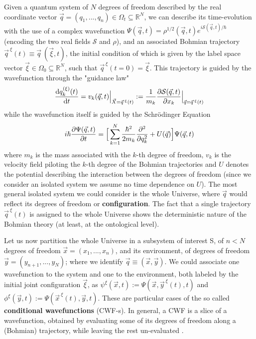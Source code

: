 \documentclass[11pt, a4paper]{article} %
\newcommand{\R}{\mathbb{R}} %
\begin{document}
Given a quantum system of $N$ degrees of freedom described by the real coordinate vector $\vec{q}=(q_1,..., q_n)\in\Omega_t\subseteq\R^N$, we can describe its time-evolution with the use of a complex wavefunction $\Psi(\vec{q},t)=\rho^{1/2}(\vec{q},t)e^{i\mathcal{S}(\vec{q},t)/\hbar}$ (encoding the two real fields $\mathcal{S}$ and $\rho$), and an associated Bohmian trajectory $\vec{q}^{\:\xi}(t)\equiv \vec{q}\:(\vec{\xi},t)$, the initial condition of which is given by the label space vector $\vec{\xi}\in\Omega_0\subseteq\R^N$, such that $\vec{q}^{\:\xi}(t=0)=\vec{\xi}$. This trajectory is guided by the wavefunction through the "guidance law"
\begin{equation}\label{GL}
\dv{q_k^{ (\xi)}(t)}{t} = v_k(\vec{q},t)\Big\rvert_{\vec{X}=\vec{q}^{\:\xi}(t)}:=\frac{1}{m_k} \pdv{\mathcal{S}(\vec{q},t)}{x_k}\Big\rvert_{\vec{q}=\vec{q}^{\:\xi}(t)}
\end{equation}
while the wavefunction itself is guided by the Schrödinger Equation \cite{Bohm,Holland,Durr,JordiXavier}
\begin{equation}\label{SE}
i\hbar\pdv{\Psi(\vec{q},t)}{t}=\Big[ \sum_{k=1}^N \frac{\hbar^2}{2m_k}\pdv[2]{}{q_k}+U(\vec{q})\Big]\Psi(\vec{q},t)
\end{equation}
where $m_k$ is the mass associated with the $k$-th degree of freedom, $v_k$ is the velocity field piloting the $k$-th degree of the Bohmian trajectories and $U$ denotes the potential describing the interaction between the degrees of freedom (since we consider an isolated system we assume no time dependence on $U$). The most general isolated system we could consider is the whole Universe, where $\vec{q}$ would reflect its degrees of freedom or {\bf configuration}. The fact that a single trajectory $\vec{q}^{\:\xi}(t)$ is assigned to the whole Universe shows the deterministic nature of the Bohmian theory (at least, at the ontological level). 

Let us now partition the whole Universe in a subsystem of interest S, of $n<N$ degrees of freedom $\vec{x}=(x_1,...,x_n)$, and its environment, of degrees of freedom $\vec{y}=(y_{n+1},...,y_N)$; where we identify $\vec{q}\equiv (\vec{x},\vec{y})$. We could associate one wavefunction to the system and one to the environment, both labeled by the initial joint configuration $\vec{\xi}$, as $\psi^\xi(\vec{x},t):=\Psi(\vec{x},\vec{y}^{\:\xi}(t),t)$ and $\phi^\xi(\vec{y},t):=\Psi(\vec{x}^{\:\xi}(t),\vec{y},t)$. These are particular cases of the so called {\bf conditional wavefunctions} (CWF-s). In general, a CWF is a slice of a wavefunction, obtained by evaluating some of its degrees of freedom along a (Bohmian) trajectory, while leaving the rest un-evaluated \cite{Absolute, JordiXavier}. 
\end{document}
